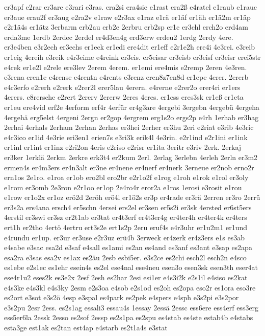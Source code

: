 {er3apf
e2rar
er3are
e3rari
e3ras.
era2si
era4sie
e1rast
era2ß
e4ratel
e1raub
e1rauc
er3aue
erau2f
er3aug
e2ra2v
e1raw
e2r3ax
e1raz
e1rä
er1äf
er1äh
er1ä2m
er1äp
e2r1ä4s
er1ätz
3erbarm
erb2au
erb2e
2erbru
erb2sp
er1c
er3chl
erch2o
erd4am
erda3me
1erdb
2erdec
2erdel
er4d3en4g
erd3erw
erdeu2
1erdg
2erdy
4ere.
er3e4ben
e3r2ech
er3echs
er1eck
er1edi
ere4dit
er1eff
e2r1e2h
ere4i
4e3rei.
e3reib
er1eig
4ereih
e3reik
e4r3eime
e4reink
er3eis.
er5eisar
er3eisb
er3eisf
er3eisr
erei5str
e4rek
er1e2l
e2rele
ere3lev
2erem
4erem.
er1emi
ere4mis
e2remp
2eren
4e3ren.
e3rena
eren1e
e4rense
e4rentn
e4rents
e3renz
eren8z7en8d
er1epe
4erer.
2ererb
e4r3erfo
e2rerh
e2rerk
e2rer2l
erer5lau
4erern.
e4rerne
e2rer2o
erer4ri
er1ers
4erers.
e8rersche
e2rert
2ererv
2ererw
2eres
4eres.
er1ess
eres3sk
er1eß
er1eta
er1eu
ere4vid
erf2e
4erform
erf4r
4erfür
er4g3are
4ergebi
3ergebn
4ergebü
4ergeha
4ergehä
erg5elst
4ergeni
2ergn
er2gop
4ergrem
erg1s2o
ergs2p
e4rh
1erhab
er3hag
2erhai
4erhals
2erham
2erhan
2erhas
er3hei
2erher
er3hu
2eri
e2riat
e3rib
4e3ric
e4r3ico
er1id
4e3rie
eri3en1
erien7s
e3ri3k
erik4l
4e3rin.
e2r1ind
e2r1ini
er1ink
er1inl
er1int
er1inz
e2ri2on
4eris
e2riso
e2risr
er1ita
3eritr
e3riv
2erk.
2erkaj
er3ker
1erklä
2erkm
2erkre
erk3t4
er2kum
2erl.
2erlag
3erlebn
4erleh
2erln
er3m2
ermen4s
er4m3ers
er4n3alt
er3ne
er4nene
er4nerf
er4nerk
3erneue
er2nob
erno2r
ern1os
2e1ro.
e1roa
er1ob
ero2bl
ero2br
e2r1o2f
e1rog
e1roh
e1rok
e1rol
er3oly
e1rom
er3omb
2e3ron
e2r1oo
er1op
2e4ro4r
eror2a
e1ros
1erosi
e3rosit
e1rou
e1row
er1o2x
er1oz
erö2d
2eröh
erö4l
er1ö2s
er3p
er4rade
er3rä
2erren
er3ro
2errü
er3s2a
ers4ana
ersch4
er5schn
4ersei
ers2el
er3sen
er5s2i
er3sk
4ersted
er6st5ers
4erstil
er3swi
er3sz
er2t1ab
er3tat
er4t3erf
er4t3er4g
er4ter4h
er4ter4k
er4ters
ert1h
er2tho
4ertö
4ertru
ert3s2e
ert1s2p
2eru
eruf4s
e4r3uhr
er1u2m1
er1und
e4rundu
er1up.
er3ur
er3use
e2r3uz
erü4b
3erweck
er4zerk
er4z3ers
e1s
es3ab
e4sabe
e3sac
esa2d
e3saf
e4sall
es1ami
es2an
es4and
es3anf
es3ant
e3sap
es2apa
esa2ra
e3sas
esa2v
es1ax
es2äu
2esb
esbi5er.
e3s2ce
es2chi
esch2l
esch2n
e4sco
es1ebe
e2s1ec
es1ehr
esein4s
es2el
ese4nal
ese4neu
esen3o
esen3sk
esen3th
eser4at
ese4r1u2
eses2k
es3e2x
2esf
2esh
es2har
2esi
esi1er
e4s3i2k
e2s1il
e4siso
es2kat
e4s3ke
e4s3kl
e4s3ky
2esm
e2s3oa
e4sob
e2s1od
es2oh
es2opa
eso2r
es1ora
eso3re
es2ort
e3sot
e3s2ö
4esp
e3spal
es4park
es2pek
e4spers
e4sph
e3s2pi
e3s2por
e3s2pu
2esr
2ess.
es2s1ag
essali3
essau4s
1essay
2essä
2essc
ess6ere
ess4erf
ess3erg
ess5er6la
2essk
2esso
es2sof
2essp
es2s1pa
es2spu
es4stab
es4ste
estab4b
e4stabs
esta3ge
est1ak
es2tan
est4ap
e4starb
es2t1a4s
e3stat
}
